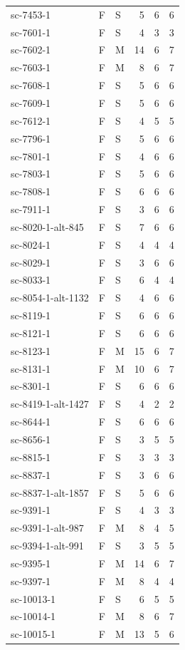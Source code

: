 \begin{longtable}{@{}p{}llrrr@{}}
sc-7453-1 & F & S & 5 & 6 & 6\\
sc-7601-1 & F & S & 4 & 3 & 3\\
sc-7602-1 & F & M & 14 & 6 & 7\\
sc-7603-1 & F & M & 8 & 6 & 7\\
sc-7608-1 & F & S & 5 & 6 & 6\\
sc-7609-1 & F & S & 5 & 6 & 6\\
sc-7612-1 & F & S & 4 & 5 & 5\\
sc-7796-1 & F & S & 5 & 6 & 6\\
sc-7801-1 & F & S & 4 & 6 & 6\\
sc-7803-1 & F & S & 5 & 6 & 6\\
sc-7808-1 & F & S & 6 & 6 & 6\\
sc-7911-1 & F & S & 3 & 6 & 6\\
sc-8020-1-alt-845 & F & S & 7 & 6 & 6\\
sc-8024-1 & F & S & 4 & 4 & 4\\
sc-8029-1 & F & S & 3 & 6 & 6\\
sc-8033-1 & F & S & 6 & 4 & 4\\
sc-8054-1-alt-1132 & F & S & 4 & 6 & 6\\
sc-8119-1 & F & S & 6 & 6 & 6\\
sc-8121-1 & F & S & 6 & 6 & 6\\
sc-8123-1 & F & M & 15 & 6 & 7\\
sc-8131-1 & F & M & 10 & 6 & 7\\
sc-8301-1 & F & S & 6 & 6 & 6\\
sc-8419-1-alt-1427 & F & S & 4 & 2 & 2\\
sc-8644-1 & F & S & 6 & 6 & 6\\
sc-8656-1 & F & S & 3 & 5 & 5\\
sc-8815-1 & F & S & 3 & 3 & 3\\
sc-8837-1 & F & S & 3 & 6 & 6\\
sc-8837-1-alt-1857 & F & S & 5 & 6 & 6\\
sc-9391-1 & F & S & 4 & 3 & 3\\
sc-9391-1-alt-987 & F & M & 8 & 4 & 5\\
sc-9394-1-alt-991 & F & S & 3 & 5 & 5\\
sc-9395-1 & F & M & 14 & 6 & 7\\
sc-9397-1 & F & M & 8 & 4 & 4\\
sc-10013-1 & F & S & 6 & 5 & 5\\
sc-10014-1 & F & M & 8 & 6 & 7\\
sc-10015-1 & F & M & 13 & 5 & 6\\

\end{longtable}
